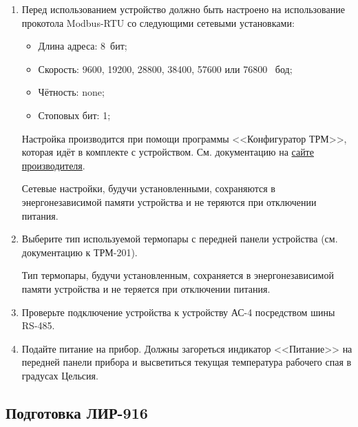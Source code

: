 \documentclass[12pt, a4paper, twocolumn]{report}
\begin{document}
\begin{enumerate}

\item Перед использованием устройство должно быть настроено на использование прокотола Modbus-RTU со следующими сетевыми установками:

\begin{itemize}
\item Длина адреса: 8~бит;
\item Скорость: 9600, 19200, 28800, 38400, 57600 или 76800 ~бод;
\item Чётность: none;
\item Стоповых бит: 1;
\end{itemize}

Настройка производится при помощи программы <<Конфигуратор ТРМ>>, которая идёт в комплекте с устройством. См. документацию на \href{http://www.owen.ru/catalog/izmeritel_regulyator_odnokanal_nij_s_rs_485_oven_trm201/opisanie}{сайте производителя}.

Сетевые настройки, будучи установленными, сохраняются в энергонезависимой памяти устройства и не теряются при отключении питания.

\item Выберите тип используемой термопары с передней панели устройства (см. документацию к ТРМ-201).

Тип термопары, будучи установленным, сохраняется в энергонезависимой памяти устройства и не теряется при отключении питания.

\item Проверьте подключение устройства к устройству АС-4 посредством шины RS-485.

\item Подайте питание на прибор. Должны загореться индикатор <<Питание>> на передней панели прибора и высветиться текущая температура рабочего спая в градусах Цельсия.

\end{enumerate}

\subsection{Подготовка ЛИР-916}
\end{document}
